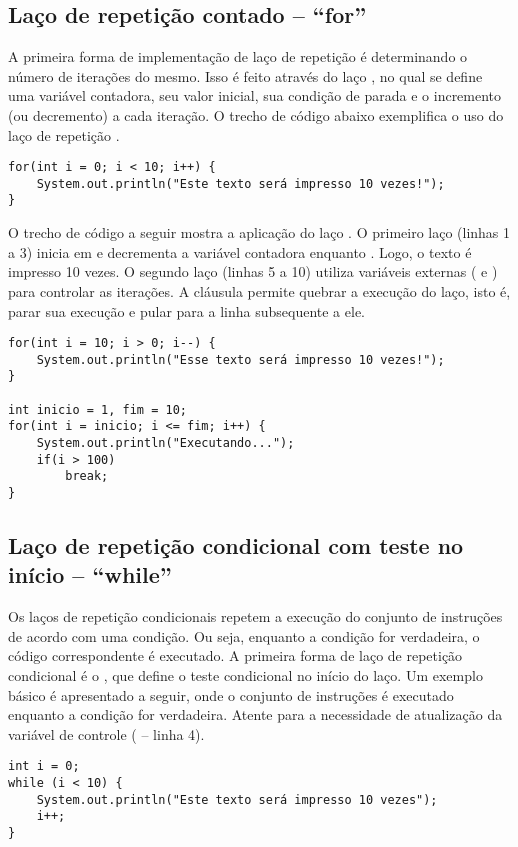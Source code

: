 \subsection{Laço de repetição contado -- ``for''}
A primeira forma de implementação de laço de repetição é determinando o número de iterações do mesmo. Isso é feito através do laço , no qual se define uma variável contadora, seu valor inicial, sua condição de parada e o incremento (ou decremento) a cada iteração. O trecho de código abaixo exemplifica o uso do laço de repetição .

\begin{verbatim}
for(int i = 0; i < 10; i++) {
	System.out.println("Este texto será impresso 10 vezes!");
}
\end{verbatim}

O trecho de código a seguir mostra a aplicação do laço . O primeiro laço (linhas 1 a 3) inicia em  e decrementa a variável contadora enquanto . Logo, o texto é impresso 10 vezes. O segundo laço (linhas 5 a 10) utiliza variáveis externas ( e ) para controlar as iterações. A cláusula  permite quebrar a execução do laço, isto é, parar sua execução e pular para a linha subsequente a ele.

\begin{verbatim}
for(int i = 10; i > 0; i--) {
	System.out.println("Esse texto será impresso 10 vezes!");
}

int inicio = 1, fim = 10;
for(int i = inicio; i <= fim; i++) {
	System.out.println("Executando...");
	if(i > 100)
		break;
}
\end{verbatim}

\subsection{Laço de repetição condicional com teste no início -- ``while''}
Os laços de repetição condicionais repetem a execução do conjunto de instruções de acordo com uma condição. Ou seja, enquanto a condição for verdadeira, o código correspondente é executado. A primeira forma de laço de repetição condicional é o , que define o teste condicional no início do laço. Um exemplo básico é apresentado a seguir, onde o conjunto de instruções é executado enquanto a condição  for verdadeira. Atente para a necessidade de atualização da variável de controle ( -- linha 4).

\begin{verbatim}
int i = 0;
while (i < 10) {
	System.out.println("Este texto será impresso 10 vezes");
	i++;
}
\end{verbatim}

